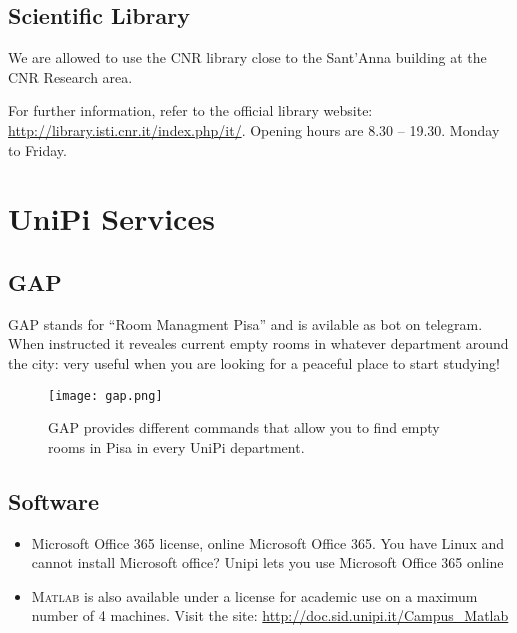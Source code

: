 \documentclass[11pt,fleqn,oneside]{book} %
\begin{document}

\section{Scientific Library}
We are allowed to use the CNR library close to the Sant’Anna building at the CNR Research area.

For further information, refer to the official library website: \url{http://library.isti.cnr.it/index.php/it/}.
Opening hours are 8.30 – 19.30. Monday to Friday.



\chapter{UniPi Services}


\section{GAP}
GAP stands for ``Room Managment Pisa'' and is avilable as bot on telegram. When instructed it reveales current empty rooms in whatever department around the city: very useful when you are looking for a peaceful place to start studying!
\begin{figure}[h]
  \centering\texttt{[image: gap.png]}
  \caption{GAP provides different commands that allow you to find empty rooms in Pisa in every UniPi department.}
\end{figure}


\section{Software}
\begin{itemize}
  \item Microsoft Office 365 license, online Microsoft Office 365. You have Linux and cannot install Microsoft office? Unipi lets you use Microsoft Office 365 online
  \item \textsc{Matlab} is also available under a license for academic use on a maximum number of 4 machines. Visit the site: \url{http://doc.sid.unipi.it/Campus_Matlab}
\end{itemize}  
\end{document}

